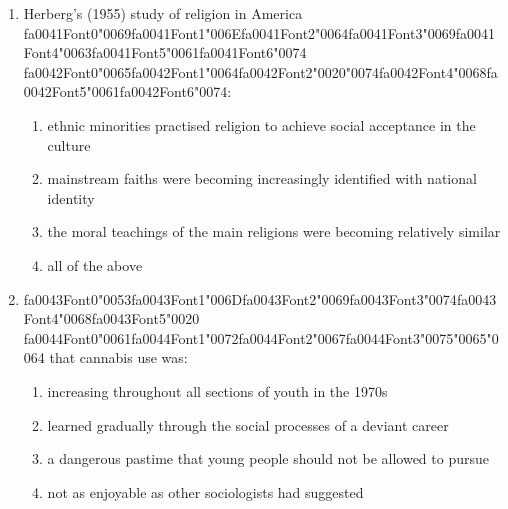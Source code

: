 \documentclass[12pt]{article}
\begin{document}
\begin{enumerate}[label=\arabic*.]
\begin{enumerate}[label=(\alph*)]
    \item the use of corporal punishment by employers
    \item excluding women from participating in waged labour
    \item punctuality, uninterrupted work and the threat of dismissal
    \item making routine tasks less monotonous
\end{enumerate}
\item Herberg's (1955) study of religion in America {\csname fa0041Font0\endcsname\char"0069}{\csname fa0041Font1\endcsname\char"006E}{\csname fa0041Font2\endcsname\char"0064}{\csname fa0041Font3\endcsname\char"0069}{\csname fa0041Font4\endcsname\char"0063}{\csname fa0041Font5\endcsname\char"0061}{\csname fa0041Font6\endcsname\char"0074} {\csname fa0042Font0\endcsname\char"0065}{\csname fa0042Font1\endcsname\char"0064}{\csname fa0042Font2\endcsname\char"0020}{\char"0074}{\csname fa0042Font4\endcsname\char"0068}{\csname fa0042Font5\endcsname\char"0061}{\csname fa0042Font6\endcsname\char"0074}:
\begin{enumerate}[label=(\alph*)]
    \item ethnic minorities practised religion to achieve social acceptance in the culture
    \item mainstream faiths were becoming increasingly identified with national identity
    \item the moral teachings of the main religions were becoming relatively similar
    \item all of the above
\end{enumerate}
\item {\csname fa0043Font0\endcsname\char"0053}{\csname fa0043Font1\endcsname\char"006D}{\csname fa0043Font2\endcsname\char"0069}{\csname fa0043Font3\endcsname\char"0074}{\csname fa0043Font4\endcsname\char"0068}{\csname fa0043Font5\endcsname\char"0020} {\csname fa0044Font0\endcsname\char"0061}{\csname fa0044Font1\endcsname\char"0072}{\csname fa0044Font2\endcsname\char"0067}{\csname fa0044Font3\endcsname\char"0075}{\char"0065}{\char"0064} that cannabis use was:
\begin{enumerate}[label=(\alph*)]
    \item increasing throughout all sections of youth in the 1970s
    \item learned gradually through the social processes of a deviant career
    \item a dangerous pastime that young people should not be allowed to pursue
    \item not as enjoyable as other sociologists had suggested
\end{enumerate}
\end{enumerate}
\end{document}
